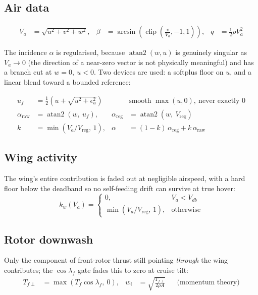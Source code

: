 \documentclass[11pt,a4paper]{article}
\newcommand{\clip}{\operatorname{clip}}
\newcommand{\atantwo}{\operatorname{atan2}}
\begin{document}
\subsection{Air data}
\begin{align}
V_a&=\sqrt{u^{2}+v^{2}+w^{2}}, &
\beta&=\arcsin\!\left(\clip\!\left(\frac{v}{V_a},-1,1\right)\right), &
\bar q&=\tfrac12\rho V_a^{2}
\end{align}

The incidence $\alpha$ is regularised, because $\atantwo(w,u)$ is genuinely
singular as $V_a\to0$ (the direction of a near-zero vector is not physically
meaningful) and has a branch cut at $w=0,\ u<0$. Two devices are used: a
softplus floor on $u$, and a linear blend toward a bounded reference:

\begin{align}
u_{f}&=\tfrac12\!\left(u+\sqrt{u^{2}+\epsilon_u^{2}}\right)
&&\text{smooth }\max(u,0),\ \text{never exactly }0\\
\alpha_{\mathrm{raw}}&=\atantwo\!\left(w,\ u_f\right), &
\alpha_{\mathrm{reg}}&=\atantwo\!\left(w,\ V_{\!\mathrm{reg}}\right)\\
k&=\min\!\left(V_a/V_{\!\mathrm{reg}},\,1\right), &
\alpha&=(1-k)\,\alpha_{\mathrm{reg}}+k\,\alpha_{\mathrm{raw}}
\end{align}

\subsection{Wing activity}
The wing's entire contribution is faded out at negligible airspeed, with a hard
floor below the deadband so no self-feeding drift can survive at true hover:
\begin{equation}
k_w(V_a)=
\begin{cases}
0, & V_a<V_{db}\\
\min\!\left(V_a/V_{\!\mathrm{reg}},\,1\right), & \text{otherwise}
\end{cases}
\end{equation}

\subsection{Rotor downwash}\label{sec:downwash}
Only the component of front-rotor thrust still pointing \emph{through} the wing
contributes; the $\cos\lambda_f$ gate fades this to zero at cruise tilt:
\begin{align}
T_{f\perp}&=\max\!\left(T_f\cos\lambda_f,\ 0\right), &
w_i&=\sqrt{\frac{T_{f\perp}}{2\rho A}} &&\text{(momentum theory)}
\end{align}
\end{document}
